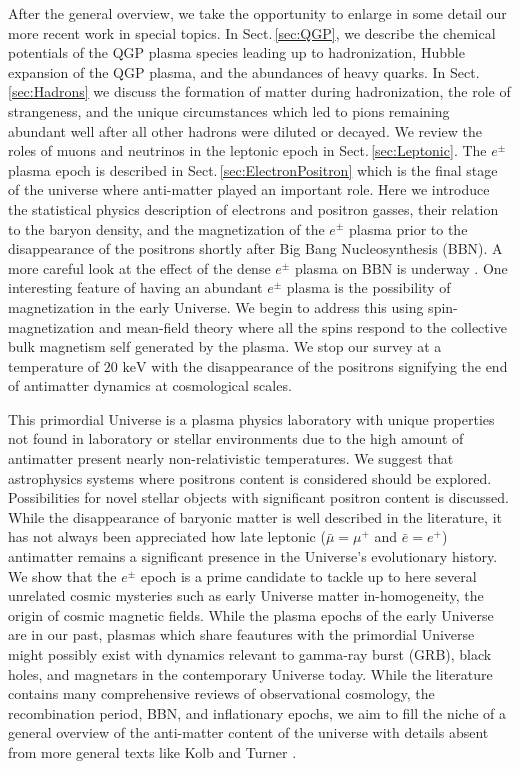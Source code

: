 \documentclass[universe,article,submit,moreauthors,pdftex,a4paper]{Definitions/mdpi}
\newcommand{\keV}{\text{ keV}}
\newcommand*{\rsec}[1]{Sect.\,{\ref{#1}}}
\begin{document}
After the general overview, we take the opportunity to enlarge in some detail our more recent work in special topics. In \rsec{sec:QGP}, we describe the chemical potentials of the QGP plasma species leading up to hadronization, Hubble expansion of the QGP plasma, and the abundances of heavy quarks. In \rsec{sec:Hadrons} we discuss the formation of matter during hadronization, the role of strangeness, and the unique circumstances which led to pions remaining abundant well after all other hadrons were diluted or decayed. We review the roles of muons and neutrinos in the leptonic epoch in \rsec{sec:Leptonic}. The $e^{\pm}$ plasma epoch is described in \rsec{sec:ElectronPositron} which is the final stage of the universe where anti-matter played an important role. Here we introduce the statistical physics description of electrons and positron gasses, their relation to the baryon density, and the magnetization of the $e^{\pm}$ plasma prior to the disappearance of the positrons shortly after Big Bang Nucleosynthesis (BBN). A more careful look at the effect of the dense $e^{\pm}$ plasma on BBN is underway \cite{Chris:2023abc}. One interesting feature of having an abundant $e^{\pm}$ plasma is the possibility of magnetization in the early Universe. We begin to address this using spin-magnetization and mean-field theory where all the spins respond to the collective bulk magnetism self generated by the plasma. We stop our survey at a temperature of $20\keV$ with the disappearance of the positrons signifying the end of antimatter dynamics at cosmological scales.

This primordial Universe is a plasma physics laboratory with unique properties not found in laboratory or stellar environments due to the high amount of antimatter present nearly non-relativistic temperatures. We suggest that astrophysics systems where positrons content is considered should be explored. Possibilities for novel stellar objects with significant positron content is discussed. While the disappearance of baryonic matter is well described in the literature, it has not always been appreciated how late leptonic ($\bar{\mu}=\mu^{+}$ and $\bar{e}=e^{+}$) antimatter remains a significant presence in the Universe's evolutionary history. We show that the $e^{\pm}$ epoch is a prime candidate to tackle up to here several unrelated cosmic mysteries such as early Universe matter in-homogeneity, the origin of cosmic magnetic fields. While the plasma epochs of the early Universe are in our past, plasmas which share feautures with the primordial Universe might possibly exist with dynamics relevant to gamma-ray burst (GRB), black holes, \cite{Ruffini:2009hg,Ruffini:2012it,Han:2011er,Ruffini:2000yu} and magnetars in the contemporary Universe today. While the literature contains many comprehensive reviews of observational cosmology, the recombination period, BBN, and inflationary epochs, we aim to fill the niche of a general overview of the anti-matter content of the universe with details absent from more general texts like Kolb and Turner \cite{Kolb:1990vq}.
\end{document}
